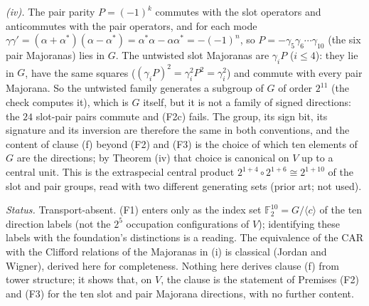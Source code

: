 \emph{(iv).} The pair parity $P = (-1)^{k}$ commutes with the slot operators and anticommutes with the pair operators, and for each mode $\gamma\gamma' = (\alpha + \alpha^{*})(\alpha - \alpha^{*}) = \alpha^{*}\alpha - \alpha\alpha^{*} = -(-1)^{n}$, so $P = -\gamma_{5}\gamma_{6}\cdots\gamma_{10}$ (the six pair Majoranas) lies in $G$. The untwisted slot Majoranas are $\gamma_{i}P$ ($i \le 4$): they lie in $G$, have the same squares ($(\gamma_{i}P)^{2} = \gamma_{i}^{2}P^{2} = \gamma_{i}^{2}$) and commute with every pair Majorana. So the untwisted family generates a subgroup of $G$ of order $2^{11}$ (the check computes it), which is $G$ itself, but it is not a family of signed directions: the $24$ slot-pair pairs commute and (F2c) fails. The group, its sign bit, its signature and its inversion are therefore the same in both conventions, and the content of clause (f) beyond (F2) and (F3) is the choice of which ten elements of $G$ are the directions; by Theorem (iv) that choice is canonical on $V$ up to a central unit. This is the extraspecial central product $2^{1+4}\circ 2^{1+6} \cong 2^{1+10}$ of the slot and pair groups, read with two different generating sets (prior art; not used).

\emph{Status.} Transport-absent. (F1) enters only as the index set $\mathbb{F}_{2}^{10} = G/\langle c\rangle$ of the ten direction labels (not the $2^{5}$ occupation configurations of $V$); identifying these labels with the foundation's distinctions is a reading. The equivalence of the CAR with the Clifford relations of the Majoranas in (i) is classical (Jordan and Wigner), derived here for completeness. Nothing here derives clause (f) from tower structure; it shows that, on $V$, the clause is the statement of Premises (F2) and (F3) for the ten slot and pair Majorana directions, with no further content.
